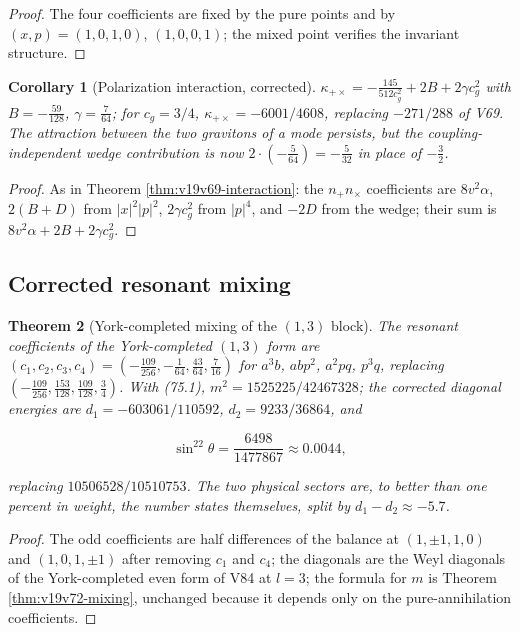 \documentclass[11pt]{article}
\newtheorem{theorem}{Theorem}[section]
\newtheorem{corollary}[theorem]{Corollary}
\theoremstyle{remark}
\begin{document}
\begin{proof}
The four coefficients are fixed by the pure points and by
\((x,p)=(1,0,1,0)\), \((1,0,0,1)\); the mixed point verifies the
invariant structure.
\end{proof}

\begin{corollary}[Polarization interaction, corrected]
\label{cor:v19v86-kappa}
\(\kappa_{+\times}=-\tfrac{145}{512c_g^2}+2B+2\gamma c_g^2\) with
\(B=-\tfrac{59}{128}\), \(\gamma=\tfrac7{64}\); for \(c_g=3/4\),
\(\kappa_{+\times}=-6001/4608\), replacing \(-271/288\) of V69.  The
attraction between the two gravitons of a mode persists, but the
coupling-independent wedge contribution is now \(2\cdot(-\tfrac5{64})=-\tfrac5{32}\)
in place of \(-\tfrac32\).
\end{corollary}

\begin{proof}
As in Theorem \ref{thm:v19v69-interaction}: the \(n_+n_\times\)
coefficients are \(8v^2\alpha\), \(2(B+D)\) from \(|x|^2|p|^2\),
\(2\gamma c_g^2\) from \(|p|^4\), and \(-2D\) from the wedge; their sum
is \(8v^2\alpha+2B+2\gamma c_g^2\).
\end{proof}

\subsection{Corrected resonant mixing}

\begin{theorem}[York-completed mixing of the \((1,3)\) block]
\label{thm:v19v86-mixing}
The resonant coefficients of the York-completed \((1,3)\) form are
\((c_1,c_2,c_3,c_4)=(-\tfrac{109}{256},-\tfrac1{64},\tfrac{43}{64},\tfrac7{16})\)
for \(a^3b\), \(abp^2\), \(a^2pq\), \(p^3q\), replacing
\((-\tfrac{109}{256},\tfrac{153}{128},\tfrac{109}{128},\tfrac34)\).  With
(75.1), \(m^2=1525225/42467328\); the corrected diagonal energies are
\(d_1=-603061/110592\), \(d_2=9233/36864\), and

\[
 \sin^22\theta=\frac{6498}{1477867}\approx0.0044,                        \tag{89.2}
\]

replacing \(10506528/10510753\).  The two physical sectors are, to
better than one percent in weight, the number states themselves,
split by \(d_1-d_2\approx-5.7\).
\end{theorem}

\begin{proof}
The odd coefficients are half differences of the balance at
\((1,\pm1,1,0)\) and \((1,0,1,\pm1)\) after removing \(c_1\) and
\(c_4\); the diagonals are the Weyl diagonals of the York-completed
even form of V84 at \(l=3\); the formula for \(m\) is Theorem
\ref{thm:v19v72-mixing}, unchanged because it depends only on the
pure-annihilation coefficients.
\end{proof}
\end{document}
